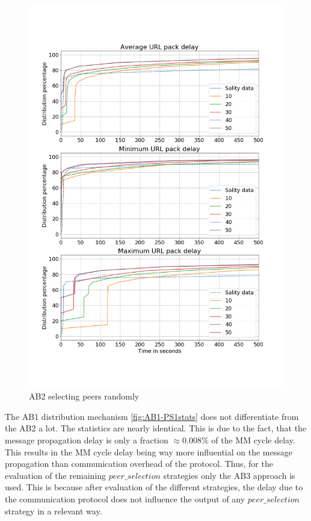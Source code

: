 \documentclass{article}
\begin{document}
\begin{figure}[H]
    \centering
    \includegraphics[width=\textwidth]{BV3-PS1.png}
    \caption{AB2 selecting peers randomly}
    \label{fig:AB2-PS1stats}
\end{figure}

The AB1 distribution mechanism \ref{fig:AB1-PS1stats} does not differentiate from the AB2 a lot. The statistics are nearly identical. This is due to the fact, that the message propagation delay is only a fraction $\approx 0.008\%$ of the MM cycle delay. This results in the MM cycle delay being way more influential on the message propagation than communication overhead of the protocol. Thus, for the evaluation of the remaining $peer\_selection$ strategies only the AB3 approach is used. This is because after evaluation of the different strategies, the delay due to the communication protocol does not influence the output of any $peer\_selection$ strategy in a relevant way.
\end{document}
